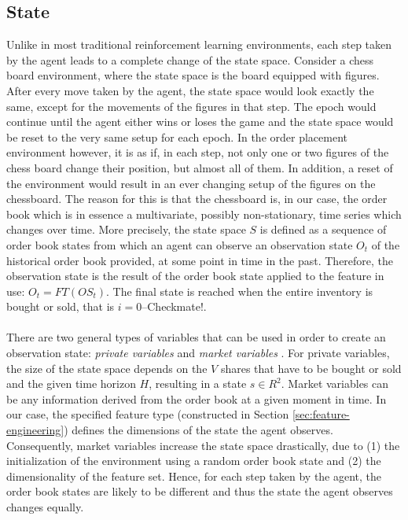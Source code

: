 \subsection{State}
\label{setup:state}
Unlike in most traditional reinforcement learning environments, each step taken by the agent leads to a complete change of the state space.
Consider a chess board environment, where the state space is the board equipped with figures. 
After every move taken by the agent, the state space would look exactly the same, except for the movements of the figures in that step.
The epoch would continue until the agent either wins or loses the game and the state space would be reset to the very same setup for each epoch.
In the order placement environment however, it is as if, in each step, not only one or two figures of the chess board change their position, but almost all of them.
In addition, a reset of the environment would result in an ever changing setup of the figures on the chessboard.
The reason for this is that the chessboard is, in our case, the order book which is in essence a multivariate, possibly non-stationary, time series which changes over time.
More precisely, the state space $S$ is defined as a sequence of order book states from which an agent can observe an observation state $O_t$ of the historical order book provided, at some point in time in the past.
Therefore, the observation state is the result of the order book state applied to the feature in use: $O_t = FT(OS_t)$.
The final state is reached when the entire inventory is bought or sold, that is $i=0$--Checkmate!.
\\
\\
There are two general types of variables that can be used in order to create an observation state: \textit{private variables} and \textit{market variables} \cite{nevmyvaka2006reinforcement}.
For private variables, the size of the state space depends on the $V$ shares that have to be bought or sold and the given time horizon $H$, resulting in a state $s \in R^2$.
Market variables can be any information derived from the order book at a given moment in time.
In our case, the specified feature type (constructed in Section \ref{sec:feature-engineering}) defines the dimensions of the state the agent observes.
Consequently, market variables increase the state space drastically, due to (1) the initialization of the environment using a random order book state and (2) the dimensionality of the feature set.
Hence, for each step taken by the agent, the order book states are likely to be different and thus the state the agent observes changes equally. 

